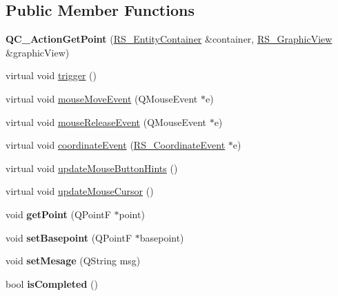 \subsection*{Public Member Functions}
\begin{DoxyCompactItemize}
\item 
\hypertarget{classQC__ActionGetPoint_a3ec2135f4b5ccef4f82af9400d2bbf5b}{{\bfseries Q\-C\-\_\-\-Action\-Get\-Point} (\hyperlink{classRS__EntityContainer}{R\-S\-\_\-\-Entity\-Container} \&container, \hyperlink{classRS__GraphicView}{R\-S\-\_\-\-Graphic\-View} \&graphic\-View)}\label{classQC__ActionGetPoint_a3ec2135f4b5ccef4f82af9400d2bbf5b}

\item 
virtual void \hyperlink{classQC__ActionGetPoint_afa25202f83e6408d6208ea6fc14fd2ad}{trigger} ()
\item 
virtual void \hyperlink{classQC__ActionGetPoint_aed17294a275014dfb70bfa13d8123ff7}{mouse\-Move\-Event} (Q\-Mouse\-Event $\ast$e)
\item 
virtual void \hyperlink{classQC__ActionGetPoint_aa1599d7b6a01bdddf8b960756994827d}{mouse\-Release\-Event} (Q\-Mouse\-Event $\ast$e)
\item 
virtual void \hyperlink{classQC__ActionGetPoint_a33a3e8be68bf82f9d24a37a1989b8ce1}{coordinate\-Event} (\hyperlink{classRS__CoordinateEvent}{R\-S\-\_\-\-Coordinate\-Event} $\ast$e)
\item 
virtual void \hyperlink{classQC__ActionGetPoint_a89bc086567fa3d2376df07b54f178682}{update\-Mouse\-Button\-Hints} ()
\item 
virtual void \hyperlink{classQC__ActionGetPoint_a3429c8cbe9ff676f76fc23f55d9a0759}{update\-Mouse\-Cursor} ()
\item 
\hypertarget{classQC__ActionGetPoint_aac3bbb554e948ead62ec586c0fa7c3f7}{void {\bfseries get\-Point} (Q\-Point\-F $\ast$point)}\label{classQC__ActionGetPoint_aac3bbb554e948ead62ec586c0fa7c3f7}

\item 
\hypertarget{classQC__ActionGetPoint_a109a92fe9e7f521b45637a959a1004ad}{void {\bfseries set\-Basepoint} (Q\-Point\-F $\ast$basepoint)}\label{classQC__ActionGetPoint_a109a92fe9e7f521b45637a959a1004ad}

\item 
\hypertarget{classQC__ActionGetPoint_a7b143e4927c3a88d18bb2280a125cfef}{void {\bfseries set\-Mesage} (Q\-String msg)}\label{classQC__ActionGetPoint_a7b143e4927c3a88d18bb2280a125cfef}

\item 
\hypertarget{classQC__ActionGetPoint_aa39e63a9e190998095378620b815f8eb}{bool {\bfseries is\-Completed} ()}\label{classQC__ActionGetPoint_aa39e63a9e190998095378620b815f8eb}

\end{DoxyCompactItemize}
